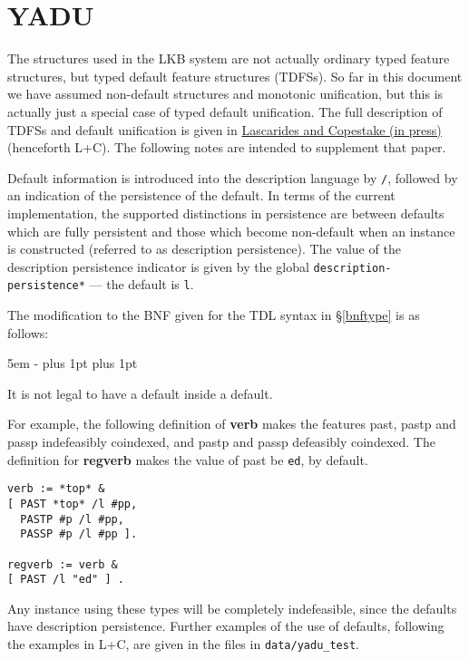 \documentclass[12pt]{report}
\begin{document}
\section{YADU}
\label{defaults}

The structures used in the LKB system are not actually 
ordinary typed feature structures, but typed default feature
structures (TDFSs).  So far in this document we have assumed
non-default structures and monotonic unification, but this is actually
just a special case of typed default unification.
The full description of TDFSs and
default unification is
given in 
\href{http://www-csli.stanford.edu/~aac/papers/yadu.pdf}{Lascarides and
Copestake (in press)} (henceforth L+C).
The following notes are intended to supplement that paper.

Default information is introduced into the description
language by {\tt /}, followed by an indication of the persistence
of the default.  In terms of the current implementation,
the supported distinctions in persistence are between defaults
which are fully persistent and those which become non-default
when an instance is constructed (referred to as description
persistence).  The value of the
description persistence indicator is given by the global
{\tt *description-persistence*} --- the default is {\tt l}.

The modification to the BNF given for the TDL
syntax in \S\ref{bnftype} is as follows:
\begin{list}{}
   {\leftmargin 5em
    \itemindent -\leftmargin
    \itemsep 0pt plus 1pt
    \parsep 0pt plus 1pt}
\end{list}
It is not legal to have a default inside a default.

For example, the following definition of {\bf verb} makes
the features {\sc past}, {\sc pastp} and {\sc passp} indefeasibly
coindexed, and {\sc pastp} and {\sc passp} defeasibly coindexed.
The definition for {\bf regverb} makes the value of {\sc past} be
{\tt ed}, by default.
\begin{verbatim}
verb := *top* &
[ PAST *top* /l #pp,
  PASTP #p /l #pp,
  PASSP #p /l #pp ].

regverb := verb &
[ PAST /l "ed" ] .
\end{verbatim}
Any instance using these types will be completely indefeasible,
since the defaults have description persistence.
Further examples of the use of defaults, following the examples in
L+C, are given in the files in {\tt data/yadu\_test}.
\end{document}
